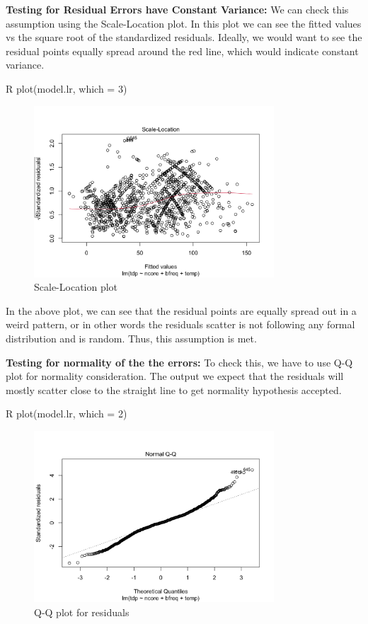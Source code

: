 \textbf{Testing for Residual Errors have Constant Variance:} We can check this assumption using the Scale-Location plot. In this plot we can see the fitted values vs the square root of the standardized residuals. Ideally, we would want to see the residual points equally spread around the red line, which would indicate constant variance.
\begin{code}{R}
plot(model.lr, which = 3)
\end{code}
\begin{figure}[H]
    \centering
    \includegraphics[width=0.8\textwidth]{graphics/linear_scatter.png}
    \caption{Scale-Location plot}
    \label{fig:32}
\end{figure}

In the above plot, we can see that the residual points are equally spread out in a weird pattern, or in other words the residuals scatter is not following any formal distribution and is random. Thus, this assumption is met.

\textbf{Testing for normality of the the errors:} To check this, we have to use Q-Q plot for normality consideration. The output we expect that the residuals will mostly scatter close to the straight line to get normality hypothesis accepted.
\begin{code}{R}
plot(model.lr, which = 2)
\end{code}
\begin{figure}[H]
    \centering
    \includegraphics[width=0.8\textwidth]{graphics/linear_normal.png}
    \caption{Q-Q plot for residuals}
    \label{fig:33}
\end{figure}


